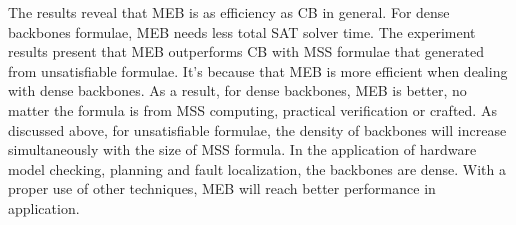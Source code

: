 The results reveal that MEB is as efficiency as CB in general. For dense backbones formulae, MEB needs less total SAT solver time. The experiment results present that MEB outperforms CB with MSS formulae that generated from unsatisfiable formulae. It's because that MEB is more efficient when dealing with dense backbones. As a result, for dense backbones, MEB is better, no matter the formula is from MSS computing, practical verification or crafted.
As discussed above, for unsatisfiable formulae, the density of backbones will increase simultaneously with the size of MSS formula. In the application of hardware model checking, planning and fault localization, the backbones are dense. With a proper use of other techniques, MEB will reach better performance in application.




